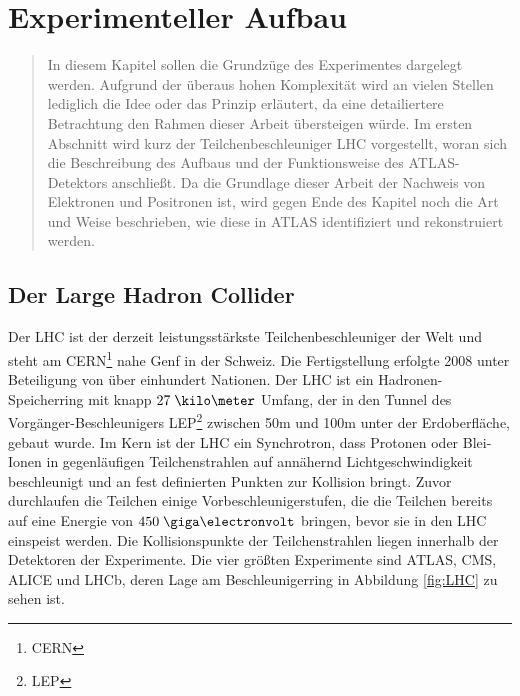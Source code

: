 
\chapter{Experimenteller Aufbau}
\label{experimenteller_aufbau}

\begin{quote}
    In diesem Kapitel sollen die Grundzüge des Experimentes dargelegt werden.
    Aufgrund der überaus hohen Komplexität wird an vielen Stellen lediglich die
    Idee oder das Prinzip erläutert, da eine detailiertere Betrachtung den
    Rahmen dieser Arbeit übersteigen würde. Im ersten Abschnitt wird kurz der
    Teilchenbeschleuniger \acs{LHC} vorgestellt, woran sich die Beschreibung
    des Aufbaus und der Funktionsweise des ATLAS-Detektors anschließt. Da die
    Grundlage dieser Arbeit der Nachweis von Elektronen und Positronen ist,
    wird gegen Ende des Kapitel noch die Art und Weise beschrieben, wie diese
    in ATLAS identifiziert und rekonstruiert werden.
\end{quote}



%
\section{Der Large Hadron Collider}
\label{lhc}

Der \acf{LHC} ist der derzeit leistungsstärkste Teilchenbeschleuniger der Welt
und steht am CERN\footnote{\acf{CERN}} nahe Genf in der Schweiz. Die
Fertigstellung erfolgte 2008 unter Beteiligung von über einhundert Nationen.
Der \ac{LHC} ist ein Hadronen-Speicherring mit knapp $27\;\kilo\meter$ Umfang,
der in den Tunnel des Vorgänger-Beschleunigers LEP\footnote{\acf{LEP}} zwischen
50m und 100m unter der Erdoberfläche, gebaut wurde. Im Kern ist der
\ac{LHC} ein Synchrotron, dass Protonen oder Blei-Ionen in gegenläufigen
Teilchenstrahlen auf annähernd Lichtgeschwindigkeit beschleunigt und an
fest definierten Punkten zur Kollision bringt. Zuvor durchlaufen die Teilchen
einige Vorbeschleunigerstufen, die die Teilchen bereits auf eine Energie von
$450\GeV$ bringen, bevor sie in den \ac{LHC} einspeist werden. Die
Kollisionspunkte der Teilchenstrahlen liegen innerhalb der Detektoren der
Experimente. Die vier größten Experimente sind \acs{ATLAS}, CMS, ALICE und
LHCb, deren Lage am Beschleunigerring in Abbildung \ref{fig:LHC} zu sehen ist.

